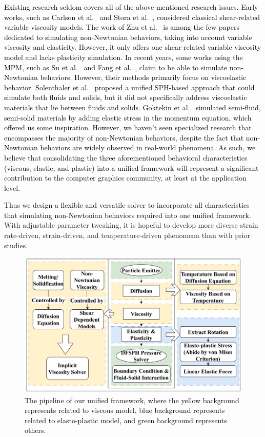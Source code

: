 \documentclass[10pt,journal,compsoc]{IEEEtran}
\newcommand{\revised}[1]{{\textcolor{black}{#1}}}
\begin{document}
\revised{
Existing research seldom covers all of the above-mentioned research issues. Early works, such as Carlson et al.~\cite{Carlson2002} and Stora et al.~\cite{Stora1999}, considered classical shear-related variable viscosity models. The work of Zhu et al.~\cite{Zhu2015-nonNewton} is among the few papers dedicated to simulating non-Newtonian behaviors, taking into account variable viscosity and elasticity. However, it only offers one shear-related variable viscosity model and lacks plasticity simulation. In recent years, some works using the MPM, such as Su et al.~\cite{Su2021} and Fang et al.~\cite{Fang2019-sillyRubber}, claim to be able to simulate non-Newtonian behaviors. However, their methods primarily focus on viscoelastic behavior. Solenthaler et al.~\cite{Solenthaler2007} proposed a unified SPH-based approach that could simulate both fluids and solids, but it did not specifically address viscoelastic materials that lie between fluids and solids. Goktekin et al.~\cite{Goktekin2004} simulated semi-fluid, semi-solid materials by adding elastic stress in the momentum equation, which offered us some inspiration. 
 However, we haven't seen specialized research that encompasses the majority of non-Newtonian behaviors, despite the fact that non-Newtonian behaviors are widely observed in real-world phenomena. As such, we believe that consolidating the three aforementioned behavioral characteristics (viscous, elastic, and plastic) into a unified framework will represent a significant contribution to the computer graphics community, at least at the application level. }

\revised{Thus we design a flexible and versatile solver to incorporate all characteristics that simulating non-Newtonian behaviors required into one unified framework.} With adjustable parameter tweaking, it is hopeful to develop more diverse strain rate-driven, strain-driven, and temperature-driven phenomena than with prior studies.

\begin{figure}[htbp]
	\centering
	\includegraphics[width=0.95\linewidth]{pics/pipeline.png}
	\caption{\revised{The pipeline of our unified framework, where the yellow background represents related to viscous model, blue background represents related to elasto-plastic model, and green background represents others.}}
	\label{fig:pipeline}
\end{figure}
\end{document}
